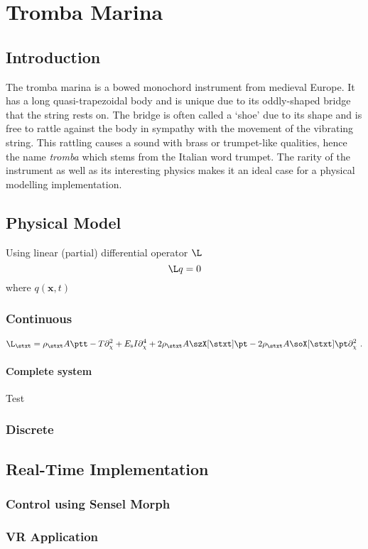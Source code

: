 \chapter{Tromba Marina}\label{ch:tromba}
\section{Introduction}
The tromba marina is a bowed monochord instrument from medieval Europe. It has a long quasi-trapezoidal body and is unique due to its oddly-shaped bridge that the string rests on. The bridge is often called a `shoe' due to its shape and is free to rattle against the body in sympathy with the movement of the vibrating string. This rattling causes a sound with brass or trumpet-like qualities, hence the name \textit{tromba} which stems from the Italian word trumpet. The rarity of the instrument as well as its interesting physics makes it an ideal case for a physical modelling implementation.

\section{Physical Model}
Using linear (partial) differential operator $\L$ 
\begin{equation}
    \L q = 0
\end{equation}
where $q(\boldsymbol{x}, t)$
\subsection{Continuous}
\begin{equation}
    \L_\stxt = \rho_\stxt A \ptt - T\partial_\chi^2 + E_\text{s}I\partial_\chi^4+2\rho_\stxt A\szX[\stxt]\pt-2\rho_\stxt A\soX[\stxt]\pt\partial_\chi^2\ .
\end{equation}

\subsubsection{Complete system}
Test
\subsection{Discrete}

\section{Real-Time Implementation}

\subsection{Control using Sensel Morph}

\subsection{VR Application}
